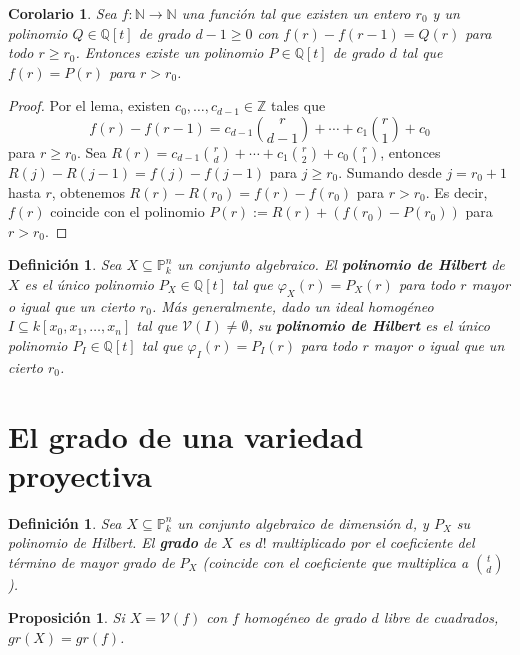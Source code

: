 \documentclass[a4paper,10pt]{book}
\newtheorem{cor}[thm]{Corolario}
\newtheorem{prop}[thm]{Proposición}
\newtheorem{defn}[thm]{Definición}
\newcommand{\PP}{\mathbb P}
\newcommand{\Pnk}{\PP^n_k}
\newcommand{\VV}{{\mathcal V}}
\begin{document}
\begin{cor}\label{polinomiodiff}
 Sea $f:{\mathbb N}\to{\mathbb N}$ una función tal que existen un entero $r_0$ y un polinomio $Q\in{\mathbb Q}[t]$ de grado $d-1\geq 0$ con $f(r)-f(r-1)=Q(r)$ para todo $r\geq r_0$. Entonces existe un polinomio $P\in{\mathbb Q}[t]$ de grado $d$ tal que $f(r)=P(r)$ para $r> r_0$.
\end{cor}

\begin{proof} Por el lema, existen $c_0,\ldots,c_{d-1}\in{\mathbb Z}$ tales que
$$
f(r)-f(r-1)=c_{d-1}{r\choose{d-1}}+\cdots+c_1{r\choose 1}+c_0
$$
para $r\geq r_0$. Sea $R(r)=c_{d-1}{r\choose{d}}+\cdots+c_1{r\choose 2}+c_0{r\choose 1}$, entonces $R(j)-R(j-1)=f(j)-f(j-1)$ para $j\geq r_0$. Sumando desde $j=r_0+1$ hasta $r$, obtenemos $R(r)-R(r_0)=f(r)-f(r_0)$ para $r>r_0$. Es decir, $f(r)$ coincide con el polinomio $P(r):=R(r)+(f(r_0)-P(r_0))$ para $r>r_0$.
\end{proof}

\begin{defn}
 Sea $X\subseteq\Pnk$ un conjunto algebraico. El {\bf polinomio de Hilbert} de $X$ es el único polinomio $P_X\in{\mathbb Q}[t]$ tal que $\varphi_X(r)=P_X(r)$ para todo $r$ mayor o igual que un cierto $r_0$. Más generalmente, dado un ideal homogéneo $I\subseteq k[x_0,x_1,\ldots,x_n]$ tal que $\VV(I)\neq\emptyset$, su {\bf polinomio de Hilbert} es el único polinomio $P_I\in{\mathbb Q}[t]$ tal que $\varphi_I(r)=P_I(r)$ para todo $r$ mayor o igual que un cierto $r_0$.
\end{defn}

\section{El grado de una variedad proyectiva}

\begin{defn}
 Sea $X\subseteq\Pnk$ un conjunto algebraico de dimensión $d$, y $P_X$ su polinomio de Hilbert. El {\bf grado} de $X$ es $d!$ multiplicado por el coeficiente del término de mayor grado de $P_X$ (coincide con el coeficiente que multiplica a $\binom{t}{d}$).
\end{defn}

\begin{prop}
Si $X=\VV(f)$ con $f$ homogéneo de grado $d$ libre de cuadrados, $gr(X)=gr(f)$. 
\end{prop}
\end{document}
